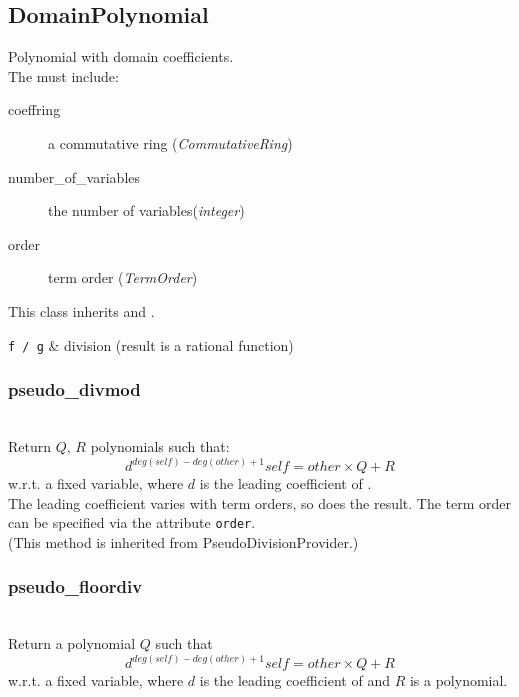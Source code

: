  \subsection{DomainPolynomial}
 Polynomial with domain coefficients.
 \initialize
   \\
  \spacing
  \quad The  must include:
  \begin{description}
  \item[coeffring] a commutative ring ({\it CommutativeRing})
  \item[number\_of\_variables] the number of variables({\it integer})
  \item[order] term order ({\it TermOrder})
  \end{description}
  \quad This class inherits  and
  .
%
  \begin{op}
    \verb+f / g+ & division (result is a rational function)\\
  \end{op}
  \method

  \subsubsection{pseudo\_divmod}
  \\
  \spacing
  \quad Return \(Q\), \(R\) polynomials such that:
  \[d^{deg(self) - deg(other) + 1} self = other \times Q + R\]
  w.r.t. a fixed variable, where \(d\) is the leading coefficient of 
  .\\
  \quad The leading coefficient varies with term orders,
  so does the result. The term order can be specified via
  the attribute {\tt order}.\\
  (This method is inherited from PseudoDivisionProvider.)

  \subsubsection{pseudo\_floordiv}
  \\
  \spacing
  \quad Return a polynomial \(Q\) such that
  \[d^{deg(self) - deg(other) + 1} self = other \times Q + R\]
  w.r.t. a fixed variable, where \(d\) is the leading coefficient of 
   and \(R\) is a polynomial.\\

